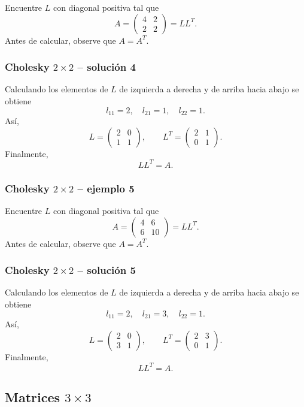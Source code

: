 Encuentre $L$ con diagonal positiva tal que
\[
A=\begin{pmatrix}4 & 2\\2 & 2\end{pmatrix}=LL^T.
\]
Antes de calcular, observe que $A=A^T$.


\subsubsection*{Cholesky $2\times 2$ -- solución 4}

Calculando los elementos de $L$ de izquierda a derecha y de arriba hacia abajo se obtiene
\[
l_{11}=2,\quad l_{21}=1,\quad l_{22}=1.
\]
Así,
\[
L=\begin{pmatrix}2 & 0\\1 & 1\end{pmatrix},\qquad L^T=\begin{pmatrix}2 & 1\\0 & 1\end{pmatrix}.
\]
Finalmente,
\[
\boxed{LL^T=A}.
\]


\subsubsection*{Cholesky $2\times 2$ -- ejemplo 5}

Encuentre $L$ con diagonal positiva tal que
\[
A=\begin{pmatrix}4 & 6\\6 & 10\end{pmatrix}=LL^T.
\]
Antes de calcular, observe que $A=A^T$.


\subsubsection*{Cholesky $2\times 2$ -- solución 5}

Calculando los elementos de $L$ de izquierda a derecha y de arriba hacia abajo se obtiene
\[
l_{11}=2,\quad l_{21}=3,\quad l_{22}=1.
\]
Así,
\[
L=\begin{pmatrix}2 & 0\\3 & 1\end{pmatrix},\qquad L^T=\begin{pmatrix}2 & 3\\0 & 1\end{pmatrix}.
\]
Finalmente,
\[
\boxed{LL^T=A}.
\]

\subsection{Matrices $3\times 3$}


